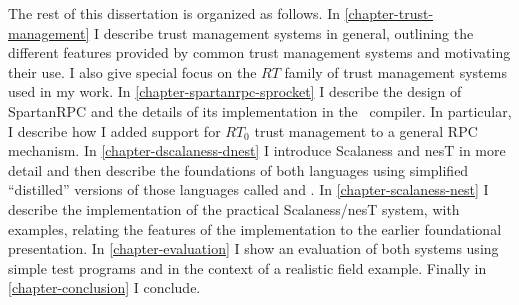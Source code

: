 The rest of this dissertation is organized as follows. In \autoref{chapter-trust-management} I
describe trust management systems in general, outlining the different features provided by
common trust management systems and motivating their use. I also give special focus on the $RT$
family of trust management systems used in my work. In \autoref{chapter-spartanrpc-sprocket} I
describe the design of SpartanRPC and the details of its implementation in the \Sprocket\
compiler. In particular, I describe how I added support for $RT_0$ trust management to a general
RPC mechanism. In \autoref{chapter-dscalaness-dnest} I introduce Scalaness and nesT in more
detail and then describe the foundations of both languages using simplified ``distilled''
versions of those languages called \newterm{DScalaness} and \newterm{DnesT}. In
\autoref{chapter-scalaness-nest} I describe the implementation of the practical Scalaness/nesT
system, with examples, relating the features of the implementation to the earlier foundational
presentation. In \autoref{chapter-evaluation} I show an evaluation of both systems using simple
test programs and in the context of a realistic field example. Finally in
\autoref{chapter-conclusion} I conclude.

